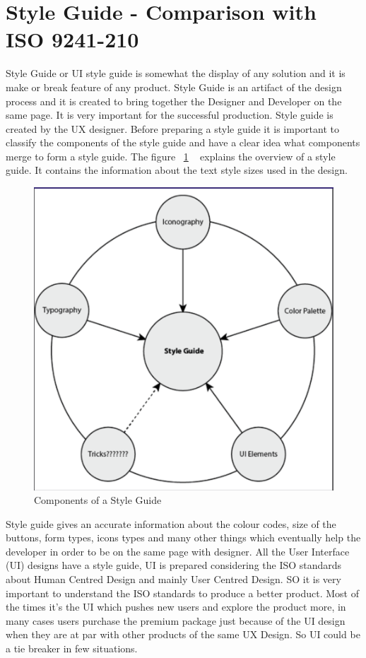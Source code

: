 \section{Style Guide - Comparison with ISO 9241-210}
Style Guide or UI style guide is somewhat the display of any solution and it is make or break feature of any product. Style Guide is an artifact of the design process and it  is created to bring together the Designer and Developer on the same page. It is very important for the successful production. Style guide is created by the UX designer. Before preparing a style guide it is important to classify the components of the style guide and have a clear idea what components merge to form a style guide. The figure ~\ref {fig:style} ~\cite{sguide} explains the overview of a style guide. It contains the information about the text style sizes used in the design. \par
\begin{figure}[htbp]
\begin{center}
\includegraphics[width=4 in, height=3 in]{style.png}
\caption{Components of a Style Guide}
\label{fig:style}
\end{center}
\end{figure}
Style guide gives an accurate information about the colour codes, size of the buttons, form types, icons types and many other things which eventually help the developer in order to be on the same page with designer. All the User Interface (UI) designs have a style guide, UI is prepared considering the ISO standards about Human Centred Design and mainly User Centred Design.  SO it is very important to understand the ISO standards to produce a better product. Most of the times it's the UI  which pushes new users and explore the product more, in many cases users purchase the premium package just because of the UI design when they are at par with other products of the same UX Design.  So UI could be a tie breaker in few situations. \par
